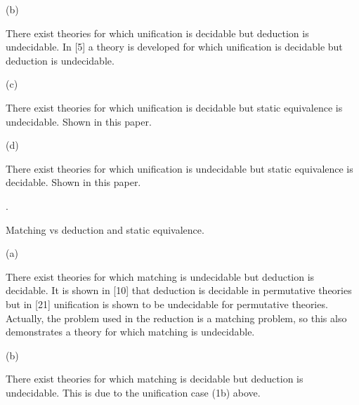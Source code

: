  
 
\par\noindent  (b) 
 
There exist theories for which unification is decidable but deduction is undecidable. In [5] a theory is developed for which unification is decidable but deduction is undecidable.\par
 
 
 
\par\noindent  (c) 
 
There exist theories for which unification is decidable but static equivalence is undecidable. Shown in this paper.\par
 
 
 
\par\noindent  (d) 
 
There exist theories for which unification is undecidable but static equivalence is decidable. Shown in this paper.\par
 
 
  
 
 
\par{}. 
 
Matching vs deduction and static equivalence.\par
  
\par\noindent  (a) 
 
There exist theories for which matching is undecidable but deduction is decidable. It is shown in [10] that deduction is decidable in permutative theories but in [21] unification is shown to be undecidable for permutative theories. Actually, the problem used in the reduction is a matching problem, so this also demonstrates a theory for which matching is undecidable.\par
 
 
 
\par\noindent  (b) 
 
There exist theories for which matching is decidable but deduction is undecidable. This is due to the unification case (1b) above.\par
 
